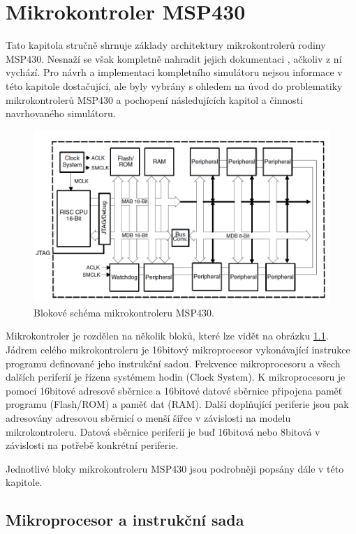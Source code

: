 \chapter{Mikrokontroler MSP430}

Tato kapitola stručně shrnuje základy architektury mikrokontrolerů rodiny MSP430. Nesnaží se však kompletně nahradit jejich dokumentaci \cite{msp430family} \cite{msp430book}, ačkoliv z ní vychází. Pro návrh a implementaci kompletního simulátoru nejsou informace v této kapitole dostačující, ale byly vybrány s ohledem na úvod do problematiky mikrokontrolerů MSP430 a pochopení následujících kapitol a činnosti navrhovaného simulátoru.

\begin{figure}[ht]
\centering
\includegraphics[trim=0cm 0cm 0cm 0cm, scale=0.5]{fig/msp430block}
\caption{Blokové schéma mikrokontroleru MSP430.}
\label{fig:msp430block}
\end{figure}

Mikrokontroler je rozdělen na několik bloků, které lze vidět na obrázku \ref{fig:msp430block}. Jádrem celého mikrokontroleru je 16bitový mikroprocesor
vykonávající instrukce programu definované jeho instrukční sadou. Frekvence mikroprocesoru a všech dalších periferií je řízena systémem hodin (Clock System). K mikroprocesoru je pomocí 16bitové adresové sběrnice a 16bitové datové sběrnice připojena paměť programu (Flash/ROM) a paměť dat (RAM). Další doplňující periferie jsou pak adresovány adresovou sběrnicí o menší šířce v závislosti na modelu mikrokontroleru. Datová sběrnice periferií je buď 16bitová nebo 8bitová v závislosti na potřebě konkrétní periferie.

Jednotlivé bloky mikrokontroleru MSP430 jsou podrobněji popsány dále v této kapitole.

\section{Mikroprocesor a instrukční sada}

